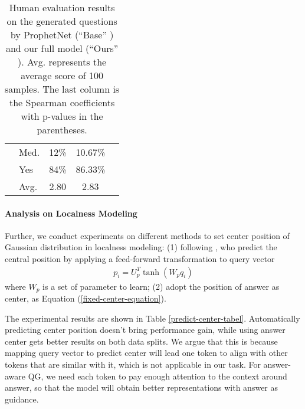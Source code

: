 \documentclass[11pt]{article}
\begin{document}
\begin{table}[t]
\begin{tabular}{@{}clccc@{}}
\multicolumn{1}{c|}{}                           & \multicolumn{1}{l}{Med.}         & 12\%          & \multicolumn{1}{c|}{10.67\%} &                                                                            \\
\multicolumn{1}{c|}{}                           & \multicolumn{1}{l}{Yes}            & 84\%          & \multicolumn{1}{c|}{86.33\%} &                                                                            \\ \cmidrule(lr){2-4}
\multicolumn{1}{c|}{}                           & Avg.                             & 2.80          & \multicolumn{1}{c|}{2.83}    &                                                                            \\ \bottomrule[1pt]
\end{tabular}
\caption{Human evaluation results on the generated questions by ProphetNet (``Base'' ) and our full model (``Ours'' ). Avg. represents the average score of 100 samples. The last column is the Spearman coefficients with p-values in the parentheses.}
\label{human-eval-table}
\end{table}

\paragraph{Analysis on Localness Modeling}
Further, we conduct experiments on different methods to set center position of Gaussian distribution in localness modeling: (1) following \citet{yang-etal-2018-modeling}, who predict the central position by applying a feed-forward transformation to query vector
\begin{gather}
    p_i = U_p^T \operatorname{tanh}(W_p q_i)
\end{gather}
where $W_p$ is a set of parameter to learn; (2) adopt the position of answer as center, as Equation (\ref{fixed-center-equation}). 

The experimental results are shown in Table \ref{predict-center-tabel}. Automatically predicting center position doesn't bring performance gain, while using answer center gets better results on both data splits. We argue that this is because mapping query vector to predict center will lead one token to align with other tokens that are similar with it, which is not applicable in our task. For answer-aware QG, we need each token to pay enough attention to the context around answer, so that the model will obtain better representations with answer as guidance.
\end{document}
